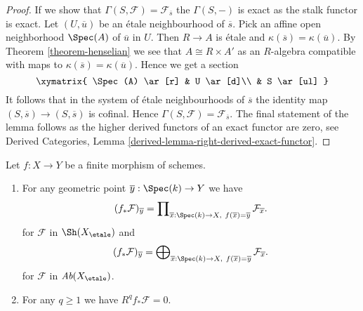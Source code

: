 \begin{proof}
If we show that $\Gamma(S, \mathcal{F}) = \mathcal{F}_{\overline{s}}$
the $\Gamma(S, -)$ is exact as the stalk functor is exact.
Let $(U, \overline{u})$ be an \'etale neighbourhood of $\overline{s}$.
Pick an affine open neighborhood $\Spec(A)$ of $\overline{u}$ in $U$.
Then $R \to A$ is \'etale and $\kappa(\overline{s}) = \kappa(\overline{u})$.
By Theorem \ref{theorem-henselian} we see that $A \cong R \times A'$
as an $R$-algebra compatible with maps to
$\kappa(\overline{s}) = \kappa(\overline{u})$.
Hence we get a section
$$
\xymatrix{
\Spec(A) \ar[r] & U \ar[d]\\
& S \ar[ul]
}
$$
It follows that in the system of \'etale neighbourhoods of $\overline{s}$
the identity map $(S, \overline{s}) \to (S, \overline{s})$ is cofinal.
Hence $\Gamma(S, \mathcal{F}) = \mathcal{F}_{\overline{s}}$.
The final statement of the lemma follows as the higher derived
functors of an exact functor are zero, see
Derived Categories, Lemma \ref{derived-lemma-right-derived-exact-functor}.
\end{proof}

\begin{proposition}
\label{proposition-finite-higher-direct-image-zero}
Let $f : X \to Y$ be a finite morphism of schemes.
\begin{enumerate}
\item For any geometric point $\overline{y} : \Spec(k) \to Y$ we have
$$
(f_*\mathcal{F})_{\overline{y}} =
\prod\nolimits_{\overline{x} : \Spec(k) \to X,\ f(\overline{x}) =
\overline{y}} \mathcal{F}_{\overline{x}}.
$$
for $\mathcal{F}$ in $\Sh(X_\etale)$ and
$$
(f_*\mathcal{F})_{\overline{y}} =
\bigoplus\nolimits_{\overline{x} : \Spec(k) \to X,\ f(\overline{x}) =
\overline{y}} \mathcal{F}_{\overline{x}}.
$$
for $\mathcal{F}$ in $\textit{Ab}(X_\etale)$.
\item For any $q \geq 1$ we have $R^q f_*\mathcal{F} = 0$.
\end{enumerate}
\end{proposition}


